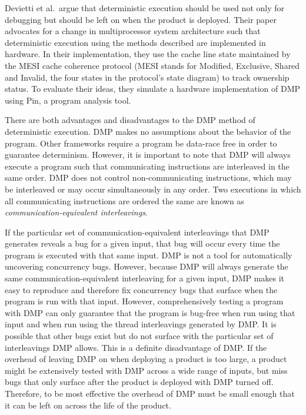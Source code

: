 Devietti et al.\ argue that deterministic execution should be used not
only for debugging but should be left on when the product is deployed.
Their paper advocates for a change in multiprocessor system
architecture such that deterministic execution using the methods
described are implemented in hardware.  In their implementation, they
use the cache line state maintained by the MESI cache coherence
protocol (MESI stands for Modified, Exclusive, Shared and Invalid, the
four states in the protocol's state diagram) to track ownership
status.  To evaluate their ideas, they simulate a hardware
implementation of DMP using Pin, a program analysis tool.

There are both advantages and disadvantages to the DMP method of
deterministic execution.  DMP makes no assumptions about the behavior
of the program.  Other frameworks require a program be data-race free
in order to guarantee determinism.  However, it is important to note
that DMP will always execute a program such that communicating
instructions are interleaved in the same order.  DMP does not control
non-communicating instructions, which may be interleaved or may occur
simultaneously in any order.  Two executions in which all
communicating instructions are ordered the same are known as
\emph{communication-equivalent interleavings}.

If the particular set of communication-equivalent interleavings that
DMP generates reveals a bug for a given input, that bug will occur
every time the program is executed with that same input.  DMP is not a
tool for automatically uncovering concurrency bugs.  However, because
DMP will always generate the same communication-equivalent
interleaving for a given input, DMP makes it easy to reproduce and
therefore fix concurrency bugs that surface when the program is run
with that input.  However, comprehensively testing a program with DMP
can only guarantee that the program is bug-free when run using that
input and when run using the thread interleavings generated by DMP.
It is possible that other bugs exist but do not surface with the
particular set of interleavings DMP allows.  This is a definite
disadvantage of DMP.  If the overhead of leaving DMP on when deploying
a product is too large, a product might be extensively tested with DMP
across a wide range of inputs, but miss bugs that only surface after
the product is deployed with DMP turned off.  Therefore, to be most
effective the overhead of DMP must be small enough that it can be left
on across the life of the product.

